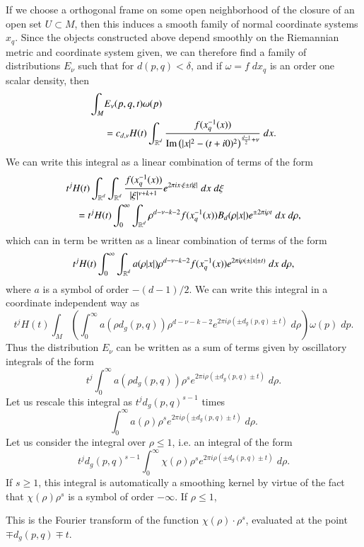 If we choose a orthogonal frame on some open neighborhood of the closure of an open set $U \subset M$, then this induces a smooth family of normal coordinate systems $x_q$. Since the objects constructed above depend smoothly on the Riemannian metric and coordinate system given, we can therefore find a family of distributions $E_\nu$ such that for $d(p,q) < \delta$, and if $\omega = f\; dx_q$ is an order one scalar density, then
%
\begin{align*}
    \int_M & E_\nu(p,q,t) \omega(p)\\
    &= c_{d,\nu} H(t) \int_{\operatorname{\mathbb{R}}^d} \frac{f( x_q^{-1}(x) )}{\text{Im} \left( |x|^2 - (t + i0)^2 \right)^{\frac{d-1}{2} + \nu}}\; dx.
\end{align*}
%
We can write this integral as a linear combination of terms of the form
%
\begin{align*}
    & t^j H(t) \int_{\operatorname{\mathbb{R}}^d} \int_{\operatorname{\mathbb{R}}^d} \frac{f( x_q^{-1}(x) )}{|\xi|^{\nu + k + 1}} e^{2 \pi i x \cdot \xi \pm t |\xi|}\; dx\; d\xi\\
    & \quad = t^j H(t) \int_0^\infty \int_{\operatorname{\mathbb{R}}^d} \rho^{d - \nu - k - 2} f( x_q^{-1}(x) ) B_d(\rho |x|) e^{\pm 2 \pi i \rho t}\; dx\; d\rho,
\end{align*}
%
which can in term be written as a linear combination of terms of the form
%
\[ t^j H(t) \int_0^\infty \int_{\operatorname{\mathbb{R}}^d} a(\rho |x|) \rho^{d - \nu - k - 2} f( x_q^{-1}(x) ) e^{2 \pi i \rho (\pm |x| \pm t)}\; dx\; d\rho, \]
%
where $a$ is a symbol of order $-(d-1)/2$. We can write this integral in a coordinate independent way as
%
\[ t^j H(t) \int_M \left( \int_0^\infty a( \rho d_g(p,q) ) \rho^{d - \nu - k - 2} e^{2 \pi i \rho (\pm d_g(p,q) \pm t)}\; d\rho \right) \omega(p)\; dp. \]
%
Thus the distribution $E_\nu$ can be written as a sum of terms given by oscillatory integrals of the form
%
\[ t^j \int_0^\infty a( \rho d_g(p,q) ) \rho^s e^{2 \pi i \rho ( \pm d_g(p,q) \pm t )}\; d\rho. \]
%
Let us rescale this integral as $t^j d_g(p,q)^{s-1}$ times
%
\[ \int_0^\infty a(\rho) \rho^s e^{2 \pi i \rho ( \pm d_g(p,q) \pm t )}\; d\rho. \]
%
Let us consider the integral over $\rho \leq 1$, i.e. an integral of the form
%
\[ t^j d_g(p,q)^{s-1} \int_0^\infty \chi(\rho) \rho^s e^{2 \pi i \rho ( \pm d_g(p,q) \pm t )}\; d\rho. \]
%
If $s \geq 1$, this integral is automatically a smoothing kernel by virtue of the fact that $\chi(\rho) \rho^s$ is a symbol of order $-\infty$. If $\rho \leq 1$, 

This is the Fourier transform of the function $\chi(\rho) \cdot \rho^s$, evaluated at the point $\mp d_g(p,q) \mp t$.



